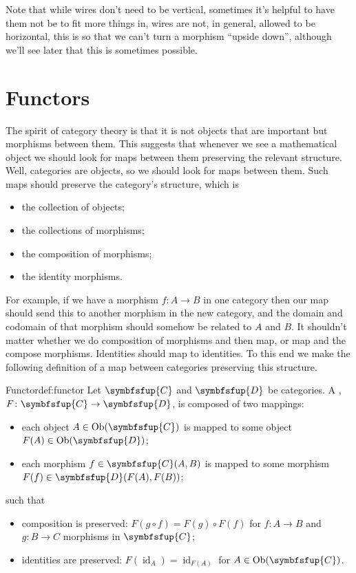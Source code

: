 \documentclass[fleqn]{NotesClass}
\newcommand{\cat}[1]{\symbfsfup{#1}}
\DeclareMathOperator{\Ob}{Ob}
\DeclareMathOperator{\id}{id}
\begin{document}
    Note that while wires don't need to be vertical, sometimes it's helpful to have them not be to fit more things in, wires are not, in general, allowed to be horizontal, this is so that we can't turn a morphism \enquote{upside down}, although we'll see later that this is sometimes possible.
    
    
    \section{Functors}
    The spirit of category theory is that it is not objects that are important but morphisms between them.
    This suggests that whenever we see a mathematical object we should look for maps between them preserving the relevant structure.
    Well, categories are objects, so we should look for maps between them.
    Such maps should preserve the category's structure, which is
    \begin{itemize}
        \item the collection of objects;
        \item the collections of morphisms;
        \item the composition of morphisms;
        \item the identity morphisms.
    \end{itemize}
    For example, if we have a morphism \(f \colon A \to B\) in one category then our map should send this to another morphism in the new category, and the domain and codomain of that morphism should somehow be related to \(A\) and \(B\).
    It shouldn't matter whether we do composition of morphisms and then map, or map and the compose morphisms.
    Identities should map to identities.
    To this end we make the following definition of a map between categories preserving this structure.
    
    \begin{dfn}{Functor}{def:functor}
        Let \(\cat{C}\) and \(\cat{D}\) be categories.
        A , \(F \colon \cat{C} \to \cat{D}\), is composed of two mappings:
        \begin{itemize}
            \item each object \(A \in \Ob(\cat{C})\) is mapped to some object \(F(A) \in \Ob(\cat{D})\);
            \item each morphism \(f \in \cat{C}(A, B)\) is mapped to some morphism \(F(f) \in \cat{D}(F(A), F(B))\);
        \end{itemize}
        such that
        \begin{itemize}
            \item composition is preserved: \(F(g \circ f) = F(g) \circ F(f)\) for \(f \colon A \to B\) and \(g \colon B \to C\) morphisms in \(\cat{C}\);
            \item identities are preserved: \(F(\id_A) = \id_{F(A)}\) for \(A \in \Ob(\cat{C})\).
        \end{itemize}
    \end{dfn}
    
\end{document}
